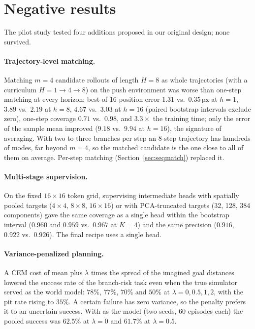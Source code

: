 \section{Negative results}
\label{app:negative}
The pilot study tested four additions proposed in our original design; none survived.

\paragraph{Trajectory-level matching.}
Matching $m{=}4$ candidate rollouts of length $H{=}8$ as whole trajectories (with a curriculum $H = 1 \to 4 \to 8$) on the push environment was worse than one-step matching at every horizon: best-of-16 position error $1.31$ vs.\ $0.35$\,px at $h{=}1$, $3.89$ vs.\ $2.19$ at $h{=}8$, $4.67$ vs.\ $3.03$ at $h{=}16$ (paired bootstrap intervals exclude zero), one-step coverage $0.71$ vs.\ $0.98$, and $3.3\times$ the training time; only the error of the sample mean improved ($9.18$ vs.\ $9.94$ at $h{=}16$), the signature of averaging. With two to three branches per step an 8-step trajectory has hundreds of modes, far beyond $m{=}4$, so the matched candidate is the one close to all of them on average. Per-step matching (Section~\ref{sec:seqmatch}) replaced it.

\paragraph{Multi-stage supervision.}
On the fixed $16\times16$ token grid, supervising intermediate heads with spatially pooled targets ($4\times4$, $8\times8$, $16\times16$) or with PCA-truncated targets (32, 128, 384 components) gave the same coverage as a single head within the bootstrap interval ($0.960$ and $0.959$ vs.\ $0.967$ at $K{=}4$) and the same precision ($0.916$, $0.922$ vs.\ $0.926$). The final recipe uses a single head.

\paragraph{Variance-penalized planning.}
A CEM cost of mean plus $\lambda$ times the spread of the imagined goal distances lowered the success rate of the branch-risk task even when the true simulator served as the world model: $78\%$, $77\%$, $70\%$ and $50\%$ at $\lambda = 0, 0.5, 1, 2$, with the pit rate rising to $35\%$. A certain failure has zero variance, so the penalty prefers it to an uncertain success. With \imlewm{} as the model (two seeds, 60 episodes each) the pooled success was $62.5\%$ at $\lambda = 0$ and $61.7\%$ at $\lambda = 0.5$.

